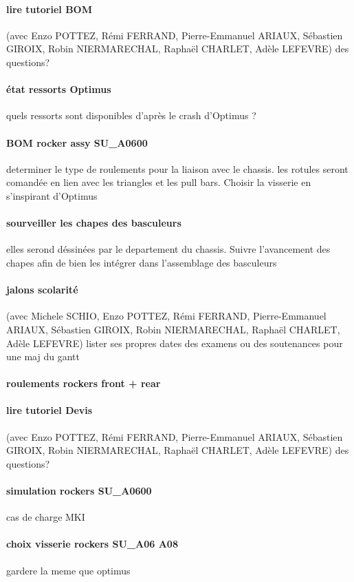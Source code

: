 \paragraph{lire tutoriel BOM} (avec Enzo POTTEZ, Rémi FERRAND, Pierre-Emmanuel ARIAUX, Sébastien GIROIX, Robin NIERMARECHAL, Raphaël CHARLET, Adèle LEFEVRE) des questions?
\paragraph{état ressorts Optimus} quels ressorts sont disponibles d'après le crash d'Optimus ?
\paragraph{BOM rocker assy SU\_A0600} determiner le type de roulements pour la liaison avec le chassis. les rotules seront comandée en lien avec les triangles et les pull bars. Choisir la visserie en s'inspirant d'Optimus
\paragraph{sourveiller les chapes des basculeurs} elles serond déssinées par le departement du chassis. Suivre l'avancement des chapes afin de bien les intégrer dans l'assemblage des basculeurs
\paragraph{jalons scolarité} (avec Michele SCHIO, Enzo POTTEZ, Rémi FERRAND, Pierre-Emmanuel ARIAUX, Sébastien GIROIX, Robin NIERMARECHAL, Raphaël CHARLET, Adèle LEFEVRE) lister ses propres dates des examens ou des soutenances pour une maj du gantt
\paragraph{roulements rockers front + rear} 
\paragraph{lire tutoriel Devis} (avec Enzo POTTEZ, Rémi FERRAND, Pierre-Emmanuel ARIAUX, Sébastien GIROIX, Robin NIERMARECHAL, Raphaël CHARLET, Adèle LEFEVRE) des questions?
\paragraph{simulation rockers SU\_A0600} cas de charge MKI
\paragraph{choix visserie rockers SU\_A06 A08} gardere la meme que optimus

